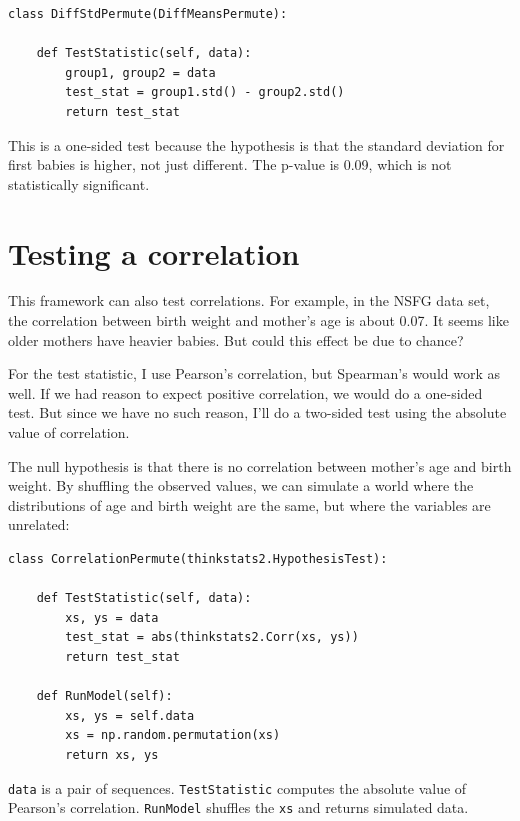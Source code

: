 \documentclass[12pt]{book}
\theoremstyle{exercise}
\begin{document}
\begin{verbatim}
class DiffStdPermute(DiffMeansPermute):

    def TestStatistic(self, data):
        group1, group2 = data
        test_stat = group1.std() - group2.std()
        return test_stat
\end{verbatim}

This is a one-sided test because the hypothesis is that the standard
deviation for first babies is higher, not just different.  The p-value
is 0.09, which is not statistically significant.%
%
%
%


\section{Testing a correlation}%
\label{corrtest}

This framework can also test correlations.  For example, in the NSFG
data set, the correlation between birth weight and mother's age is
about 0.07.  It seems like older mothers have heavier babies.  But
could this effect be due to chance?%
%

For the test statistic, I use
Pearson's correlation, but Spearman's would work as well.
If we had reason to expect positive correlation, we would do a
one-sided test.  But since we have no such reason, I'll
do a two-sided test using the absolute value of correlation.%
%

The null hypothesis is that there is no correlation between mother's
age and birth weight.  By shuffling the observed values, we can
simulate a world where the distributions of age and
birth weight are the same, but where the variables are unrelated:%
%
%

\begin{verbatim}
class CorrelationPermute(thinkstats2.HypothesisTest):

    def TestStatistic(self, data):
        xs, ys = data
        test_stat = abs(thinkstats2.Corr(xs, ys))
        return test_stat

    def RunModel(self):
        xs, ys = self.data
        xs = np.random.permutation(xs)
        return xs, ys
\end{verbatim}

{\tt data} is a pair of sequences.  {\tt TestStatistic} computes the
absolute value of Pearson's correlation.  {\tt RunModel} shuffles the
{\tt xs} and returns simulated data.%
%
%
\end{document}
